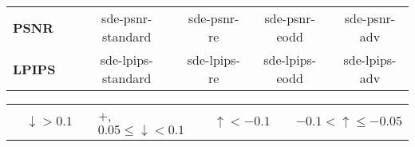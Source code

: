 \begin{table}[]
\begin{tabular}{ll|c|cccc}
    \multicolumn{2}{l|}{\textbf{PSNR}} & \cellcolor[HTML]{C0C0C0} & sde-psnr-standard & sde-psnr-re & sde-psnr-eodd & sde-psnr-adv \\
    \cline{1-2}
    
    \multicolumn{2}{l|}{\textbf{LPIPS}} & \cellcolor[HTML]{C0C0C0} & sde-lpips-standard & sde-lpips-re & sde-lpips-eodd & sde-lpips-adv \\
    \hline
    \end{tabular}
    
    \begin{tabular}{llllllll} 
        \cellcolor[HTML]{E6C321} & $ \downarrow > 0.1$ & 
        \cellcolor[HTML]{F1D892} &$+$, $0.05 \leq \downarrow < 0.1$ & 
        \cellcolor[HTML]{3089A2} & $\uparrow < -0.1$  & 
        \cellcolor[HTML]{93C1C9} & $-0.1 < \uparrow \leq -0.05$ \\
    \end{tabular}
\end{table}